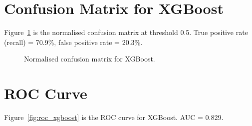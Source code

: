 \documentclass[11pt, a4paper, oneside]{book}
\begin{document}
\section{Confusion Matrix for XGBoost}
Figure~\ref{fig:confusion_xgboost} is the normalised confusion matrix at threshold 0.5. True positive rate (recall) = 70.9\%, false positive rate = 20.3\%.

\begin{figure}[htbp]
\centering
\renewcommand{\arraystretch}{1.4}
\setlength{\tabcolsep}{10pt}
\scriptsize
{}%
\caption{Normalised confusion matrix for XGBoost.}
\label{fig:confusion_xgboost}
\end{figure}

\section{ROC Curve}
Figure~\ref{fig:roc_xgboost} is the ROC curve for XGBoost. AUC = 0.829.
\end{document}
